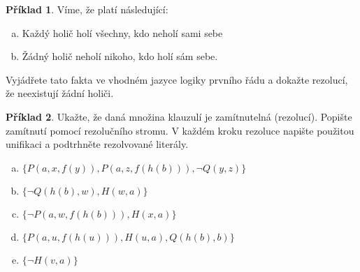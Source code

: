\documentclass[11pt,a4paper]{amsart}
\theoremstyle{definition}
\newtheorem{problem}{Příklad}
\theoremstyle{remark}
\begin{document}
\bigskip

\begin{problem} Víme, že platí následující:
\medskip
\begin{enumerate}[(a)]
\itemsep12pt
\item Každý holič holí všechny, kdo neholí sami sebe
\item Žádný holič neholí nikoho, kdo holí sám sebe.
\end{enumerate}
\medskip
Vyjádřete tato fakta ve vhodném jazyce logiky prvního řádu a dokažte rezolucí, že neexistují žádní holiči.
\end{problem}

\bigskip

\begin{problem}
Ukažte, že daná množina klauzulí je zamítnutelná (rezolucí). Popište zamítnutí pomocí rezolučního stromu. V každém kroku rezoluce napište použitou unifikaci a podtrhněte rezolvované literály.

\medskip
\begin{enumerate}[(a)]
\itemsep12pt
\item $\{P(a,x,f(y)),P(a,z,f(h(b))),\neg Q(y,z)\}$
\item $\{\neg Q(h(b),w),H(w,a)\}$
\item $\{\neg P(a,w,f(h(b))),H(x,a)\}$
\item $\{P(a,u,f(h(u))),H(u,a),Q(h(b),b)\}$
\item $\{\neg H(v,a)\}$
\end{enumerate}
\end{problem}
\end{document}
